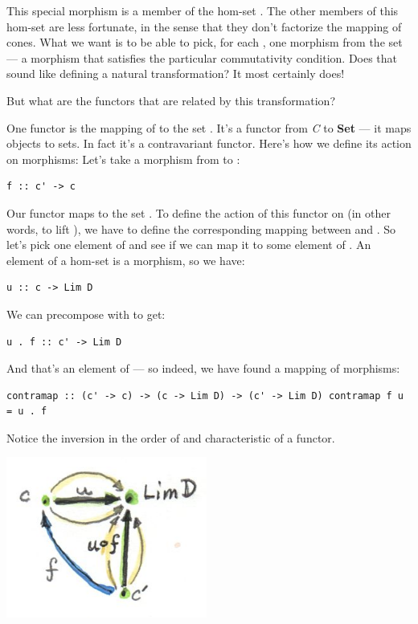 This special morphism is a member of the hom-set .
The other members of this hom-set are less fortunate, in the sense that
they don't factorize the mapping of cones. What we want is to be able to
pick, for each , one morphism from the set
 --- a morphism that satisfies the particular
commutativity condition. Does that sound like defining a natural
transformation? It most certainly does!

But what are the functors that are related by this transformation?

One functor is the mapping of  to the set
. It's a functor from \emph{C} to \textbf{Set} ---
it maps objects to sets. In fact it's a contravariant functor. Here's
how we define its action on morphisms: Let's take a morphism 
from  to :

\begin{verbatim}
f :: c' -> c
\end{verbatim}

Our functor maps  to the set
. To define the action of this functor on
 (in other words, to lift ), we have to define the
corresponding mapping between  and
. So let's pick one element  of
 and see if we can map it to some element of
. An element of a hom-set is a morphism, so
we have:

\begin{verbatim}
u :: c -> Lim D
\end{verbatim}

We can precompose  with  to get:

\begin{verbatim}
u . f :: c' -> Lim D
\end{verbatim}

And that's an element of --- so indeed, we
have found a mapping of morphisms:

\begin{verbatim}
contramap :: (c' -> c) -> (c -> Lim D) -> (c' -> Lim D) contramap f u = u . f
\end{verbatim}

Notice the inversion in the order of  and 
characteristic of a  functor.

\includegraphics[width=2.59375in]{images/homsetmapping.jpg}

